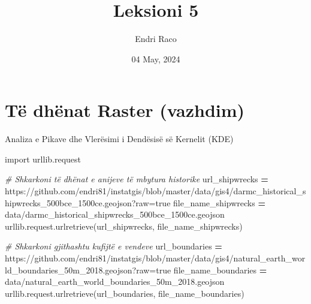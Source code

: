 \documentclass[
  ignorenonframetext,
]{beamer}
\title{Leksioni 5}
\author{Endri Raco}
\date{04 May, 2024}
\newenvironment{Shaded}{\begin{snugshade}}{\end{snugshade}}
\newcommand{\CommentTok}[1]{\textcolor[rgb]{0.56,0.35,0.01}{\textit{#1}}}
\newcommand{\ImportTok}[1]{#1}
\newcommand{\NormalTok}[1]{#1}
\newcommand{\OperatorTok}[1]{\textcolor[rgb]{0.81,0.36,0.00}{\textbf{#1}}}
\newcommand{\StringTok}[1]{\textcolor[rgb]{0.31,0.60,0.02}{#1}}
\begin{document}
\frame{\titlepage}

\begin{frame}[allowframebreaks]
  \tableofcontents[hideallsubsections]
\end{frame}
\hypertarget{tuxeb-dhuxebnat-raster-vazhdim}{%
\section{Të dhënat Raster
(vazhdim)}\label{tuxeb-dhuxebnat-raster-vazhdim}}

\begin{frame}[fragile]{Analiza e Pikave dhe Vlerësimi i Dendësisë së
Kernelit (KDE)}
\protect\hypertarget{analiza-e-pikave-dhe-vleruxebsimi-i-denduxebsisuxeb-suxeb-kernelit-kde}{}

\begin{Shaded}
\begin{Highlighting}[]
\ImportTok{import}\NormalTok{ urllib.request}

\CommentTok{\# Shkarkoni të dhënat e anijeve të mbytura historike}
\NormalTok{url\_shipwrecks }\OperatorTok{=} \StringTok{\textquotesingle{}https://github.com/endri81/instatgis/blob/master/data/gis4/darmc\_historical\_shipwrecks\_500bce\_1500ce.geojson?raw=true\textquotesingle{}}
\NormalTok{file\_name\_shipwrecks }\OperatorTok{=} \StringTok{\textquotesingle{}data/darmc\_historical\_shipwrecks\_500bce\_1500ce.geojson\textquotesingle{}}
\NormalTok{urllib.request.urlretrieve(url\_shipwrecks, file\_name\_shipwrecks)}

\CommentTok{\# Shkarkoni gjithashtu kufijtë e vendeve}
\NormalTok{url\_boundaries }\OperatorTok{=} \StringTok{\textquotesingle{}https://github.com/endri81/instatgis/blob/master/data/gis4/natural\_earth\_world\_boundaries\_50m\_2018.geojson?raw=true\textquotesingle{}}
\NormalTok{file\_name\_boundaries }\OperatorTok{=} \StringTok{\textquotesingle{}data/natural\_earth\_world\_boundaries\_50m\_2018.geojson\textquotesingle{}}
\NormalTok{urllib.request.urlretrieve(url\_boundaries, file\_name\_boundaries)}
\end{Highlighting}
\end{Shaded}
\end{frame}
\end{document}
